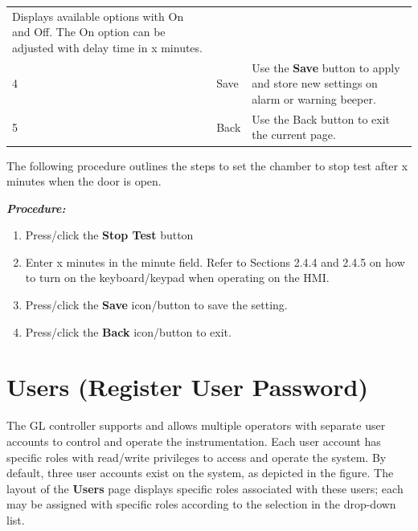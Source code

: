 \begin{longtable}[]{@{}lll@{}}
\begin{minipage}[t]{0.65\columnwidth}
Displays available options with On and Off. The On option can be
adjusted with delay time in x minutes.\strut
\end{minipage}\tabularnewline
\begin{minipage}[t]{0.04\columnwidth}\raggedright
4\strut
\end{minipage} & \begin{minipage}[t]{0.23\columnwidth}\raggedright
Save\strut
\end{minipage} & \begin{minipage}[t]{0.65\columnwidth}\raggedright
Use the \textbf{Save} button to apply and store new settings on alarm or
warning beeper.\strut
\end{minipage}\tabularnewline
\begin{minipage}[t]{0.04\columnwidth}\raggedright
5\strut
\end{minipage} & \begin{minipage}[t]{0.23\columnwidth}\raggedright
Back\strut
\end{minipage} & \begin{minipage}[t]{0.65\columnwidth}\raggedright
Use the Back button to exit the current page.\strut
\end{minipage}\tabularnewline
\bottomrule
\end{longtable}

The following procedure outlines the steps to set the chamber to stop
test after x minutes when the door is open.

\textbf{\emph{Procedure:}}

\begin{enumerate}
\def\labelenumi{\arabic{enumi}.}
\tightlist
\item
  Press/click the \textbf{Stop Test} button
\item
  Enter x minutes in the minute field. Refer to Sections 2.4.4 and 2.4.5
  on how to turn on the keyboard/keypad when operating on the HMI.\\
\item
  Press/click the \textbf{Save} icon/button to save the setting.
\item
  Press/click the \textbf{Back} icon/button to exit.
\end{enumerate}


\section{Users (Register User
Password)}

The GL controller supports and allows multiple operators with separate
user accounts to control and operate the instrumentation. Each user
account has specific roles with read/write privileges to access and
operate the system. By default, three user accounts exist on the system,
as depicted in the figure. The layout of the \textbf{Users} page
displays specific roles associated with these users; each may be
assigned with specific roles according to the selection in the drop-down
list.

